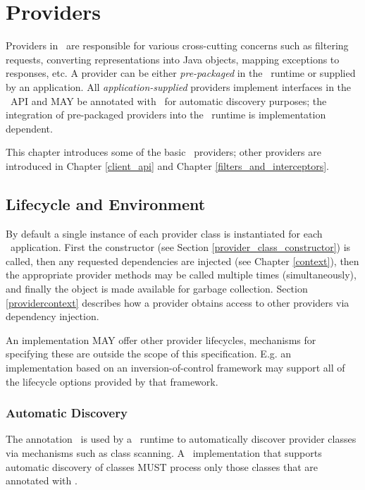 \chapter{Providers}
\label{providers}

Providers in \jaxrs\ are responsible for various cross-cutting concerns such as filtering requests, converting representations into Java objects, mapping exceptions to responses, etc. A provider can be either \emph{pre-packaged} in the \jaxrs\ runtime or supplied by an application. All \emph{application-supplied} providers implement interfaces in the \jaxrs\ API and MAY be annotated with \Provider\ for automatic discovery purposes; the integration of pre-packaged providers into the \jaxrs\ runtime is implementation dependent.

This chapter introduces some of the basic \jaxrs\ providers; other providers are introduced in Chapter \ref{client_api} and Chapter \ref{filters_and_interceptors}.

\section{Lifecycle and Environment}
\label{lifecycle_and_environment}

By default a single instance of each provider class is instantiated for each \jaxrs\ application. First the constructor (see Section \ref{provider_class_constructor}) is called, then any requested dependencies are injected (see Chapter \ref{context}), then the appropriate provider methods may be called multiple times (simultaneously), and finally the object is made available for garbage collection. Section \ref{providercontext} describes how a provider obtains access to other providers via dependency injection.

An implementation MAY offer other provider lifecycles, mechanisms for specifying these are outside the scope of this specification. E.g. an implementation based on an inversion-of-control framework may support all of the lifecycle options provided by that framework.

\subsection{Automatic Discovery}
\label{automatic_discovery}

The annotation \Provider\ is used by a \jaxrs\ runtime to automatically discover provider classes via mechanisms such as class scanning. A \jaxrs\ implementation that supports automatic discovery of classes MUST process only those classes that are annotated with \Provider.

